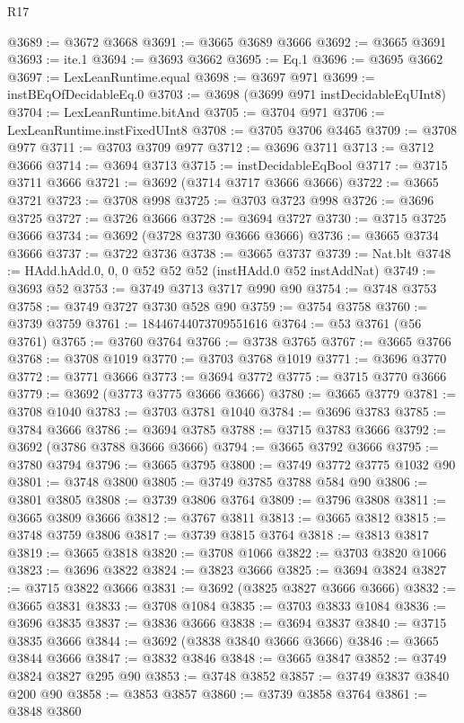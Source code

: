 \begin{lexlean}{R17}
\begin{coremodule}
@3689 := @3672 @3668
@3691 := @3665 @3689 @3666
@3692 := @3665 @3691
@3693 := ite.{1}
@3694 := @3693 @3662
@3695 := Eq.{1}
@3696 := @3695 @3662
@3697 := LexLeanRuntime.equal
@3698 := @3697 @971
@3699 := instBEqOfDecidableEq.{0}
@3703 := @3698 (@3699 @971 instDecidableEqUInt8)
@3704 := LexLeanRuntime.bitAnd
@3705 := @3704 @971
@3706 := LexLeanRuntime.instFixedUInt8
@3708 := @3705 @3706 @3465
@3709 := @3708 @977
@3711 := @3703 @3709 @977
@3712 := @3696 @3711
@3713 := @3712 @3666
@3714 := @3694 @3713
@3715 := instDecidableEqBool
@3717 := @3715 @3711 @3666
@3721 := @3692 (@3714 @3717 @3666 @3666)
@3722 := @3665 @3721
@3723 := @3708 @998
@3725 := @3703 @3723 @998
@3726 := @3696 @3725
@3727 := @3726 @3666
@3728 := @3694 @3727
@3730 := @3715 @3725 @3666
@3734 := @3692 (@3728 @3730 @3666 @3666)
@3736 := @3665 @3734 @3666
@3737 := @3722 @3736
@3738 := @3665 @3737
@3739 := Nat.blt
@3748 := HAdd.hAdd.{0, 0, 0} @52 @52 @52 (instHAdd.{0} @52 instAddNat)
@3749 := @3693 @52
@3753 := @3749 @3713 @3717 @990 @90
@3754 := @3748 @3753
@3758 := @3749 @3727 @3730 @528 @90
@3759 := @3754 @3758
@3760 := @3739 @3759
@3761 := 18446744073709551616
@3764 := @53 @3761 (@56 @3761)
@3765 := @3760 @3764
@3766 := @3738 @3765
@3767 := @3665 @3766
@3768 := @3708 @1019
@3770 := @3703 @3768 @1019
@3771 := @3696 @3770
@3772 := @3771 @3666
@3773 := @3694 @3772
@3775 := @3715 @3770 @3666
@3779 := @3692 (@3773 @3775 @3666 @3666)
@3780 := @3665 @3779
@3781 := @3708 @1040
@3783 := @3703 @3781 @1040
@3784 := @3696 @3783
@3785 := @3784 @3666
@3786 := @3694 @3785
@3788 := @3715 @3783 @3666
@3792 := @3692 (@3786 @3788 @3666 @3666)
@3794 := @3665 @3792 @3666
@3795 := @3780 @3794
@3796 := @3665 @3795
@3800 := @3749 @3772 @3775 @1032 @90
@3801 := @3748 @3800
@3805 := @3749 @3785 @3788 @584 @90
@3806 := @3801 @3805
@3808 := @3739 @3806 @3764
@3809 := @3796 @3808
@3811 := @3665 @3809 @3666
@3812 := @3767 @3811
@3813 := @3665 @3812
@3815 := @3748 @3759 @3806
@3817 := @3739 @3815 @3764
@3818 := @3813 @3817
@3819 := @3665 @3818
@3820 := @3708 @1066
@3822 := @3703 @3820 @1066
@3823 := @3696 @3822
@3824 := @3823 @3666
@3825 := @3694 @3824
@3827 := @3715 @3822 @3666
@3831 := @3692 (@3825 @3827 @3666 @3666)
@3832 := @3665 @3831
@3833 := @3708 @1084
@3835 := @3703 @3833 @1084
@3836 := @3696 @3835
@3837 := @3836 @3666
@3838 := @3694 @3837
@3840 := @3715 @3835 @3666
@3844 := @3692 (@3838 @3840 @3666 @3666)
@3846 := @3665 @3844 @3666
@3847 := @3832 @3846
@3848 := @3665 @3847
@3852 := @3749 @3824 @3827 @295 @90
@3853 := @3748 @3852
@3857 := @3749 @3837 @3840 @200 @90
@3858 := @3853 @3857
@3860 := @3739 @3858 @3764
@3861 := @3848 @3860

\end{coremodule}
\end{lexlean}
